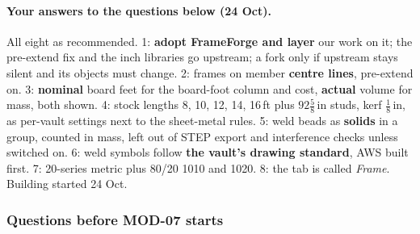 \paragraph{Your answers to the questions below (24 Oct).} All eight as recommended. 1: \textbf{adopt FrameForge and
layer} our work on it; the pre-extend fix and the inch libraries go upstream; a fork only if upstream stays silent and
its objects must change. 2: frames on member \textbf{centre lines}, pre-extend on. 3: \textbf{nominal} board feet for
the board-foot column and cost, \textbf{actual} volume for mass, both shown. 4: stock lengths 8, 10, 12, 14, 16\,ft
plus $92\tfrac58$\,in studs, kerf $\tfrac18$\,in, as per-vault settings next to the sheet-metal rules. 5: weld beads
as \textbf{solids} in a  group, counted in mass, left out of STEP export and interference checks unless
switched on. 6: weld symbols follow \textbf{the vault's drawing standard}, AWS built first. 7: 20-series metric plus
80/20 1010 and 1020. 8: the tab is called \emph{Frame}. Building started 24 Oct.

\subsubsection*{Questions before MOD-07 starts}


